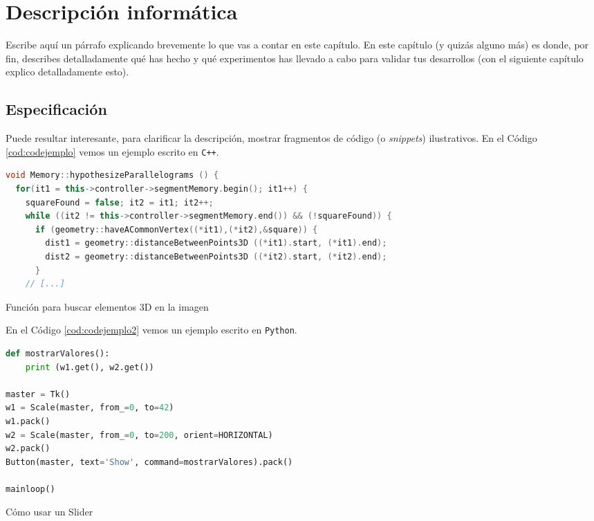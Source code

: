 \chapter{Descripción informática}
\label{cap:capitulo3}


Escribe aquí un párrafo explicando brevemente lo que vas a contar en este capítulo. En este capítulo (y quizás alguno más) es donde, por fin, describes detalladamente qué has hecho y qué experimentos has llevado a cabo para validar tus desarrollos (con el siguiente capítulo explico detalladamente esto).

\section{Especificación}

Puede resultar interesante, para clarificar la descripción, mostrar fragmentos de código (o \textit{snippets}) ilustrativos. En el Código \ref{cod:codejemplo} vemos un ejemplo escrito en \texttt{C++}.

\begin{code}[h]
\begin{lstlisting}[language=C++]
void Memory::hypothesizeParallelograms () {
  for(it1 = this->controller->segmentMemory.begin(); it1++) {
    squareFound = false; it2 = it1; it2++;
    while ((it2 != this->controller->segmentMemory.end()) && (!squareFound)) {
      if (geometry::haveACommonVertex((*it1),(*it2),&square)) {
        dist1 = geometry::distanceBetweenPoints3D ((*it1).start, (*it1).end);
        dist2 = geometry::distanceBetweenPoints3D ((*it2).start, (*it2).end);
      }
    // [...]
\end{lstlisting}
\caption[Función para buscar elementos 3D en la imagen]{Función para buscar elementos 3D en la imagen}
\label{cod:codejemplo}
\end{code}

En el Código \ref{cod:codejemplo2} vemos un ejemplo escrito en \texttt{Python}.

\begin{code}[h]
\begin{lstlisting}[language=Python]
def mostrarValores():
    print (w1.get(), w2.get())

master = Tk()
w1 = Scale(master, from_=0, to=42)
w1.pack()
w2 = Scale(master, from_=0, to=200, orient=HORIZONTAL)
w2.pack()
Button(master, text='Show', command=mostrarValores).pack()

mainloop()
\end{lstlisting}
\caption[Cómo usar un Slider]{Cómo usar un Slider}
\label{cod:codejemplo2}
\end{code}

